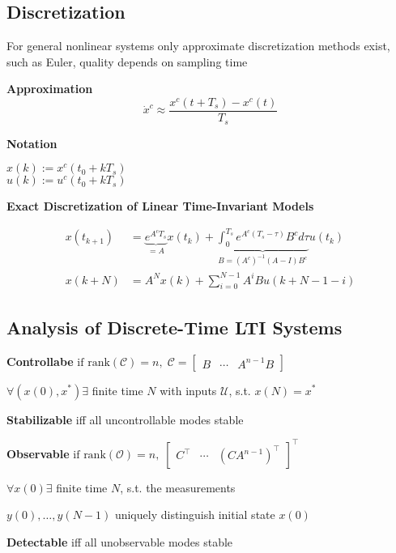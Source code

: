\subsection{Discretization}

For general nonlinear systems only approximate discretization methods
exist, such as Euler, quality depends on sampling time

\begin{minipage}[t]{0.5\linewidth}
	\textbf{Approximation}\\
	\[
		\dot{x}^c \approx \frac{x^c(t + T_s)-x^c(t)}{T_s}
	\]
\end{minipage}
\begin{minipage}[t]{0.45\linewidth}
	\textbf{Notation}

	$x(k):= x^c(t_0+kT_s)$\\
	$u(k):= u^c(t_0+kT_s)$\\
\end{minipage}

\textbf{Exact Discretization of Linear Time-Invariant Models}

\begin{align*}
	x(t_{k+1}) & =
	\underbrace{e^{A^c T_s}}
	_{=A} x(t_k) +
	\underbrace{\textstyle\int_{0}^{T_s}
		e^{A^c(T_s - \tau)}B^c d\tau}
	_{B=(A^c)^{-1}(A-I)B^c} u(t_k)
	\\
	x(k+N)     & = A^N x(k) + \textstyle\sum_{i=0}^{N-1}
	A^i B u(k+N-1-i)
\end{align*}

\subsection{Analysis of Discrete-Time LTI Systems}

\textbf{Controllabe}
$
	\text{if rank}(\mathcal{C}) = n
	,\;
	\mathcal{C} =
	\begin{bmatrix}
		B & \cdots & A^{n-1} B
	\end{bmatrix}
$

$\forall(x(0),x^*)\exists$ finite time $N$
with inputs $\mathcal{U}$, s.t. $x(N)=x^*$

\textbf{Stabilizable} iff all uncontrollable modes stable

\textbf{Observable}
$
	\text{if rank}(\mathcal{O}) = n
	,\;
	\begin{bmatrix}
		C^\top & \cdots & (CA^{n-1})^\top
	\end{bmatrix}^\top
$

$\forall x(0)\exists$ finite time $N$, s.t. the measurements

$y(0), \dots, y(N-1)$
uniquely distinguish initial state $x(0)$

\textbf{Detectable} iff all unobservable modes stable

